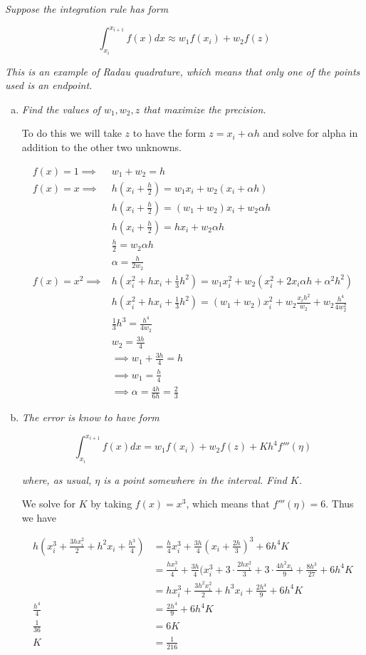 \documentclass{article}
\begin{document}
\textit{Suppose the integration rule has form}

$$\int_{x_i}^{x_{i+1}} f(x)dx \approx w_1f(x_i) + w_2f(z)$$

\noindent\textit{This is an example of Radau quadrature, which means that only one of the points used is an endpoint.}

\begin{enumerate}[(a)]
  \item \textit{Find the values of $w_1, w_2, z$ that maximize the precision.}

    To do this we will take $z$ to have the form $z = x_i + \alpha h$ and solve for alpha in addition to the other two unknowns.

    \begin{align*}
      f(x) = 1 \implies &w_1 + w_2 = h \\
      f(x) = x \implies &h(x_i + \frac{h}{2}) = w_1 x_i + w_2 (x_i + \alpha h) \\
      &h(x_i+\frac{h}{2}) = (w_1 + w_2)x_i + w_2 \alpha h \\
      &h(x_i+\frac{h}{2}) = h x_i + w_2 \alpha h \\
      &\frac{h}{2} = w_2 \alpha h \\
      &\alpha = \frac{h}{2w_2} \\
      f(x) = x^2 \implies &h(x_i^2 + hx_i + \frac{1}{3}h^2) = w_1x_i^2 + w_2(x_i^2 + 2x_i\alpha h+ \alpha^2h^2) \\
      &h(x_i^2 + hx_i + \frac{1}{3}h^2) = (w_1 + w_2)x_i^2 + w_2\frac{x_i h^2}{w_2}+ w_2\frac{h^4}{4w_2^2} \\
      &\frac{1}{3}h^3 = \frac{h^4}{4w_2} \\
      &w_2 = \frac{3h}{4} \\
      &\implies w_1 + \frac{3h}{4} = h \\
      &\implies w_1 = \frac{h}{4} \\
      &\implies \alpha = \frac{4h}{6h} = \frac{2}{3}
    \end{align*}
  \item \textit{The error is know to have form}

    $$\int_{x_i}^{x_{i+1}}f(x)dx = w_1f(x_i) + w_2 f(z) + K h^4 f'''(\eta)$$

    \textit{where, as usual, $\eta$ is a point somewhere in the interval. Find $K$.}

    We solve for $K$ by taking $f(x) = x^3$, which means that $f'''(\eta) = 6$. Thus we have

    \begin{align*}
      h(x_i^3 + \frac{3hx_i^2}{2} + h^2 x_i + \frac{h^3}{4}) &= \frac{h}{4}x_i^3 + \frac{3h}{4}(x_i + \frac{2h}{3})^3 + 6h^4K \\
      &= \frac{hx_i^3}{4} + \frac{3h}{4}(x_i^3 + 3\cdot\frac{2hx_i^2}{3} + 3\cdot\frac{4h^2x_i}{9} + \frac{8h^3}{27} + 6h^4K \\
      &= hx_i^3 + \frac{3h^2x_i^2}{2} + h^3x_i + \frac{2h^4}{9} + 6h^4K \\
      \frac{h^4}{4} &= \frac{2h^4}{9} + 6h^4K \\
      \frac{1}{36} &= 6K \\
      K &= \frac{1}{216}
    \end{align*}
\end{enumerate}
\end{document}
